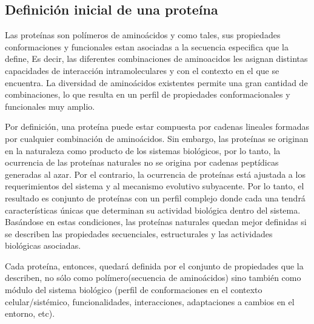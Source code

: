 \subsection{Definición inicial de una proteína}
Las proteínas son polímeros de aminoácidos y como tales, sus propiedades conformaciones y funcionales estan asociadas a la secuencia especifica que la define, 
Es decir, las diferentes combinaciones de aminoacidos les asignan distintas capacidades de interacción intramoleculares y con el contexto en el que se encuentra.
La diversidad de aminoácidos existentes permite una gran cantidad de combinaciones, lo que resulta en un perfil de propiedades conformacionales y funcionales muy amplio.

Por definición, una proteína puede estar compuesta por cadenas lineales formadas por cualquier combinación de aminoácidos.
Sin embargo, las proteínas se originan en la naturaleza como producto de los sistemas biológicos, por lo tanto, 
la ocurrencia de las proteínas naturales no se origina por cadenas peptídicas generadas al azar. 
Por el contrario, la ocurrencia de proteínas está ajustada a los requerimientos del sistema y al mecanismo evolutivo subyacente. 
Por lo tanto, el resultado es conjunto de proteínas con un perfil complejo donde cada una tendrá características únicas que determinan su actividad biológica dentro del sistema.
Basándose en estas condiciones, las proteínas naturales quedan mejor definidas si se describen las propiedades secuenciales, estructurales y las actividades biológicas asociadas. 

Cada proteína, entonces, quedará definida por el conjunto de propiedades que la describen, no sólo como polímero(secuencia de aminoácidos) 
sino también como módulo del sistema biológico (perfil de conformaciones en el contexto celular/sistémico, funcionalidades, interacciones, adaptaciones a cambios en el entorno, etc). 

